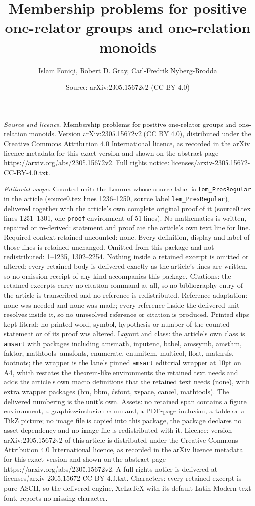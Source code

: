 \documentclass[10pt,a4paper]{amsart}
\title[Membership problems for positive one-relator groups and one-]{Membership problems for positive one-relator groups and one-relation monoids}
\author{Islam Foniqi, Robert D. Gray, Carl-Fredrik Nyberg-Brodda}
\date{Source: arXiv:2305.15672v2 (CC BY 4.0)}
\begin{document}
\maketitle

\noindent\emph{Source and licence.} Membership problems for positive one-relator groups and one-relation monoids. Version arXiv:2305.15672v2 (CC BY 4.0), distributed under the Creative Commons Attribution 4.0 International licence, as recorded in the arXiv licence metadata for this exact version and shown on the abstract page https://arxiv.org/abs/2305.15672v2. Full rights notice: licenses/arxiv-2305.15672-CC-BY-4.0.txt.\par\smallskip

\noindent\textit{Editorial scope.} Counted unit: the Lemma whose source label is \texttt{lem\_PresRegular} in the article (source0.tex lines 1236--1250, source label \texttt{lem\_PresRegular}), delivered together with the article's own complete original proof of it (source0.tex lines 1251--1301, one \texttt{proof} environment of 51 lines). No mathematics is written, repaired or re-derived: statement and proof are the article's own text line for line. Required context retained uncounted: none. Every definition, display and label of those lines is retained unchanged. Omitted from this package and not redistributed: 1--1235, 1302--2254. Nothing inside a retained excerpt is omitted or altered: every retained body is delivered exactly as the article's lines are written, so no omission receipt of any kind accompanies this package. Citations: the retained excerpts carry no citation command at all, so no bibliography entry of the article is transcribed and no reference is redistributed. Reference adaptation: none was needed and none was made; every reference inside the delivered unit resolves inside it, so no unresolved reference or citation is produced. Printed slips kept literal: no printed word, symbol, hypothesis or number of the counted statement or of its proof was altered. Layout and class: the article's own class is \texttt{amsart} with packages including amsmath, inputenc, babel, amssymb, amsthm, faktor, mathtools, amsfonts, enumerate, enumitem, multicol, float, mathrsfs, footnote; the wrapper is the lane's pinned \texttt{amsart} editorial wrapper at 10pt on A4, which restates the theorem-like environments the retained text needs and adds the article's own macro definitions that the retained text needs (none), with extra wrapper packages (bm, bbm, dsfont, xspace, cancel, mathtools). The delivered numbering is the unit's own. Assets: no retained span contains a figure environment, a graphics-inclusion command, a PDF-page inclusion, a table or a TikZ picture; no image file is copied into this package, the package declares no asset dependency and no image file is redistributed with it. Licence: version arXiv:2305.15672v2 of this article is distributed under the Creative Commons Attribution 4.0 International licence, as recorded in the arXiv licence metadata for this exact version and shown on the abstract page https://arxiv.org/abs/2305.15672v2. A full rights notice is delivered at licenses/arxiv-2305.15672-CC-BY-4.0.txt. Characters: every retained excerpt is pure ASCII, so the delivered engine, XeLaTeX with its default Latin Modern text font, reports no missing character.
\end{document}
